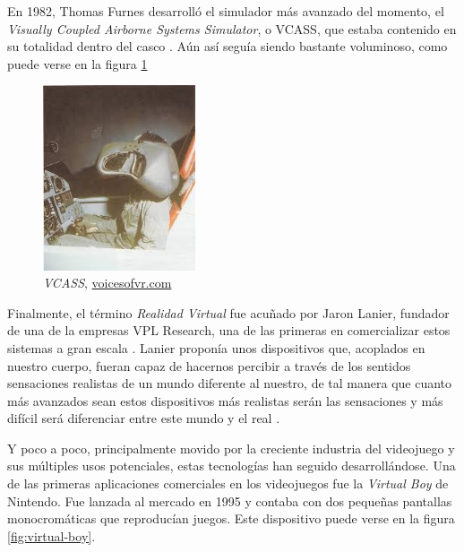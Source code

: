 En 1982, Thomas Furnes desarrolló el simulador más avanzado del momento, el \textit{Visually Coupled Airborne Systems Simulator}, o VCASS, que estaba contenido en su totalidad dentro del casco \cite{cade-08}. Aún así seguía siendo bastante voluminoso, como puede verse en la figura \ref{fig:VCASS} 

\begin{figure}[!h]
    \begin{center}
        \includegraphics[width=0.4\textwidth]{imagenes/2/VCASS.jpg}
        \caption{\textit{VCASS}, \url{voicesofvr.com}}
        \label{fig:VCASS}
    \end{center}
\end{figure}

Finalmente, el término \textit{Realidad Virtual} fue acuñado por Jaron Lanier, fundador de una de la empresas VPL Research, una de las primeras en comercializar estos sistemas a gran escala \cite{fer-02}. Lanier proponía unos dispositivos que, acoplados en nuestro cuerpo, fueran capaz de hacernos percibir a través de los sentidos sensaciones realistas de un mundo diferente al nuestro, de tal manera que cuanto más avanzados sean estos dispositivos más realistas serán las sensaciones y más difícil será diferenciar entre este mundo y el real \cite{lop-18}.

Y poco a poco, principalmente movido por la creciente industria del videojuego y sus múltiples usos potenciales, estas tecnologías han seguido desarrollándose. Una de las primeras aplicaciones comerciales en los videojuegos fue la \textit{Virtual Boy} de Nintendo. Fue lanzada al mercado en 1995 y contaba con dos pequeñas pantallas monocromáticas que reproducían juegos. Este dispositivo puede verse en la figura \ref{fig:virtual-boy}.

